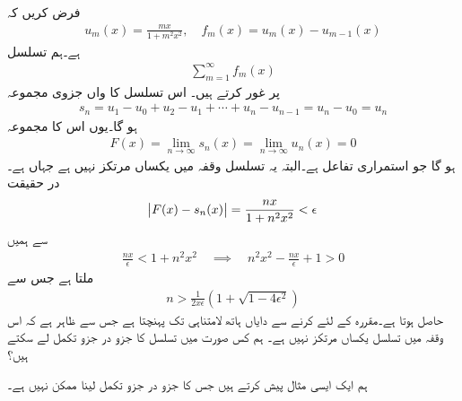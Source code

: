 \quad
فرض کریں کہ
\begin{align*}
u_m(x)=\frac{mx}{1+m^2x^2}, \quad f_m(x)=u_m(x)-u_{m-1}(x)
\end{align*}
ہے۔ہم  تسلسل
\begin{align*}
\sum\limits_{m=1}^{\infty} f_m(x)
\end{align*}
پر غور کرتے ہیں۔ اس تسلسل کا  واں جزوی مجموعہ
\begin{align*}
s_n=u_1-u_0+u_2-u_1+\cdots+u_n-u_{n-1}=u_n-u_0=u_n
\end{align*}
ہو گا۔یوں اس کا مجموعہ 
\begin{align*}
F(x)=\lim_{n\to \infty} s_n(x)=\lim_{n\to \infty} u_n(x)=0
\end{align*}
ہو گا جو استمراری تفاعل ہے۔البتہ یہ تسلسل وقفہ  میں یکساں مرتکز نہیں ہے جہاں  ہے۔در حقیقت 
\begin{align*}
\abs{F(x)-s_n(x)}=\frac{nx}{1+n^2x^2}<\epsilon
\end{align*} 
سے ہمیں 
\begin{align*}
\frac{nx}{\epsilon}<1+n^2x^2 \quad \implies \quad n^2x^2-\frac{nx}{\epsilon}+1>0
\end{align*}
ملتا ہے جس سے
\begin{align*}
n>\frac{1}{2x\epsilon}(1+\sqrt{1-4\epsilon^2})
\end{align*}
حاصل ہوتا ہے۔مقررہ  کے لئے  کرنے سے دایاں ہاتھ لامتناہی تک پہنچتا ہے جس سے ظاہر ہے کہ اس وقفہ میں تسلسل یکساں مرتکز نہیں ہے۔
ہم کس صورت میں تسلسل کا جزو در جزو تکمل لے سکتے ہیں؟

ہم ایک ایسی مثال  پیش کرتے ہیں جس کا جزو در جزو تکمل لینا  ممکن نہیں ہے۔ 

